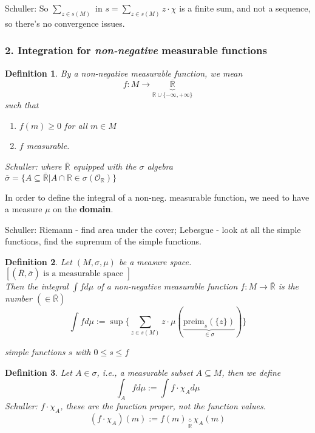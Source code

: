 \documentclass[10pt]{amsart}
\newtheorem{definition}{Definition}
\begin{document}
\begin{multicols*}{2}
\begin{enumerate}
Schuller: So $\sum_{z \in s(M)}$ in $s = \sum_{z \in s(M)} z \cdot \chi$ is a finite sum, and not a sequence, so there's no convergence issues. 

\end{enumerate}

\subsubsection{2. Integration for \emph{non-negative} measurable functions}

\begin{definition} By a non-negative measurable function, we mean
\[
f : M \to \underbrace{ \overline{\mathbb{R}}}_{ \mathbb{R} \cup \lbrace -\infty, + \infty \rbrace }
\]
such that \begin{enumerate}
	\item[(i)] $f(m) \geq 0 $ for all $m\in M$
	\item[(ii)] $f$ measurable.
\end{enumerate}
Schuller: where $\overline{\mathbb{R}}$ equipped with the $\sigma$ algebra \\
$\overline{\sigma} = \lbrace A \subseteq \overline{\mathbb{R}} | A \cap \mathbb{R} \in \sigma(\mathcal{O}_{\mathbb{R}}) \rbrace$
\end{definition}

In order to define the integral of a non-neg. measurable function, we need to have a measure $\mu$ on the \textbf{domain}.

Schuller: Riemann - find area under the cover; Lebesgue - look at all the simple functions, find the suprenum of the simple functions.

\begin{definition}
	Let $(M, \sigma, \mu)$ be a measure space. \\
	$[(\overline{R}, \overline{\sigma}) \text{ is a measurable space }]$ \\
	Then the integral $\int f d\mu$ of a non-negative measurable function $f: M \to \overline{\mathbb{R}}$ is the number $(\in \overline{\mathbb{R}})$
\[
\int f d\mu := \sup{ \lbrace \sum_{z \in s(M)} z \cdot \mu\left( \underbrace{ \text{preim}_s(\lbrace z \rbrace) }_{\in \sigma} \right) \rbrace }
\]

simple functions $s$ with $0\leq s \leq f$

\end{definition}

\begin{definition}
	Let $A \in \sigma$, i.e., a measurable subset $A \subseteq M$, then we define
	\[
	\int_A f d\mu := \int f \cdot \chi_A d\mu
	\]
	Schuller: $f\cdot \chi_A$, these are the function proper, not the function values.
	\[
	(f\cdot \chi_A)(m) := f(m) \underbrace{\cdot}_{\mathbb{R}} \chi_A(m)
	\]


\end{definition}
\end{multicols*}
\end{document}
